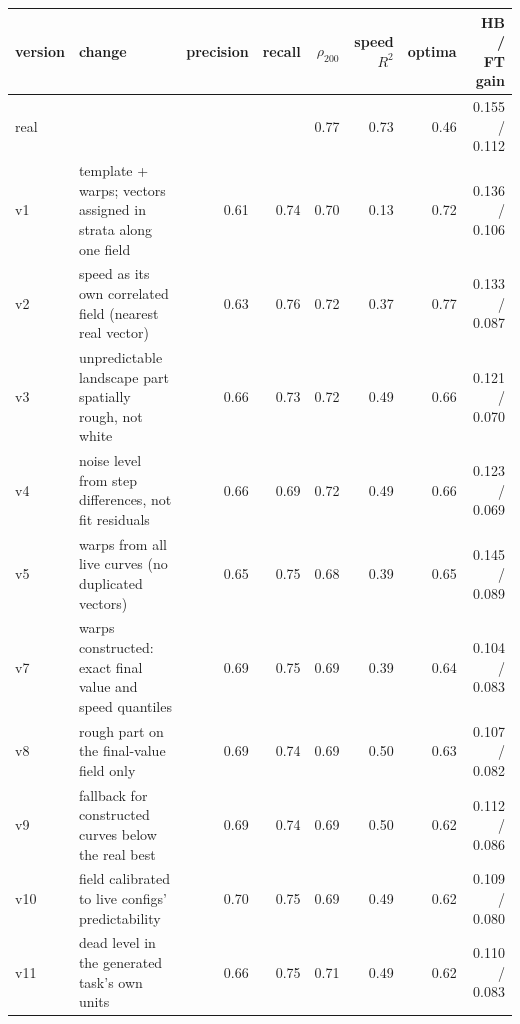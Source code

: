 \begin{tabular}{llrrrrrr}
\toprule
version & change & precision & recall & $\rho_{200}$ & speed $R^2$ & optima & HB / FT gain \\
\midrule
real & & & & 0.77 & 0.73 & 0.46 & 0.155 / 0.112 \\
\midrule
v1 & template + warps; vectors assigned in strata along one field & 0.61 & 0.74 & 0.70 & 0.13 & 0.72 & 0.136 / 0.106 \\
v2 & speed as its own correlated field (nearest real vector) & 0.63 & 0.76 & 0.72 & 0.37 & 0.77 & 0.133 / 0.087 \\
v3 & unpredictable landscape part spatially rough, not white & 0.66 & 0.73 & 0.72 & 0.49 & 0.66 & 0.121 / 0.070 \\
v4 & noise level from step differences, not fit residuals & 0.66 & 0.69 & 0.72 & 0.49 & 0.66 & 0.123 / 0.069 \\
v5 & warps from all live curves (no duplicated vectors) & 0.65 & 0.75 & 0.68 & 0.39 & 0.65 & 0.145 / 0.089 \\
v7 & warps constructed: exact final value and speed quantiles & 0.69 & 0.75 & 0.69 & 0.39 & 0.64 & 0.104 / 0.083 \\
v8 & rough part on the final-value field only & 0.69 & 0.74 & 0.69 & 0.50 & 0.63 & 0.107 / 0.082 \\
v9 & fallback for constructed curves below the real best & 0.69 & 0.74 & 0.69 & 0.50 & 0.62 & 0.112 / 0.086 \\
v10 & field calibrated to live configs' predictability & 0.70 & 0.75 & 0.69 & 0.49 & 0.62 & 0.109 / 0.080 \\
v11 & dead level in the generated task's own units & 0.66 & 0.75 & 0.71 & 0.49 & 0.62 & 0.110 / 0.083 \\
\bottomrule
\end{tabular}
